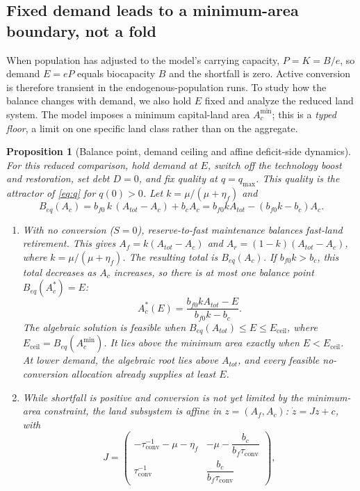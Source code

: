 \documentclass[preprint,12pt,authoryear]{elsarticle}
\newtheorem{proposition}{Proposition}
\newcommand{\Eceil}{E_{\mathrm{ceil}}}
\newcommand{\Acmin}{A_c^{\min}}
\newcommand{\tconv}{\tau_{\mathrm{conv}}}
\begin{document}
\subsection{Fixed demand leads to a minimum-area boundary, not a fold}\label{sec:ceiling}

When population has adjusted to the model's carrying capacity, $P=K=B/e$, so demand $E=eP$ equals biocapacity $B$ and the shortfall is zero. Active conversion is therefore transient in the endogenous-population runs. To study how the balance changes with demand, we also hold $E$ fixed and analyze the reduced land system. The model imposes a minimum capital-land area $\Acmin$; this is a \emph{typed floor}, a limit on one specific land class rather than on the aggregate.

\begin{proposition}[Balance point, demand ceiling and affine deficit-side dynamics]\label{prop:ceiling}
For this reduced comparison, hold demand at $E$, switch off the technology boost and restoration, set debt $D=0$, and fix quality at $q=q_{\max}$. This quality is the attractor of \eqref{eq:q} for $q(0)>0$. Let $k=\mu/(\mu+\eta_f)$ and
\begin{equation}\label{eq:Beq}
B_{eq}(A_c)=b_{f0}\,k\,(A_{tot}-A_c)+b_cA_c=b_{f0}kA_{tot}-(b_{f0}k-b_c)A_c .
\end{equation}
\begin{enumerate}[label=(\roman*)]
\item With no conversion ($S=0$), reserve-to-fast maintenance balances fast-land retirement. This gives $A_f=k(A_{tot}-A_c)$ and $A_r=(1-k)(A_{tot}-A_c)$, where $k=\mu/(\mu+\eta_f)$. The resulting total is $B_{eq}(A_c)$. If $b_{f0}k>b_c$, this total decreases as $A_c$ increases, so there is at most one balance point $B_{eq}(A_c^*)=E$:
\begin{equation}\label{eq:Acstar}
A_c^*(E)=\frac{b_{f0}kA_{tot}-E}{b_{f0}k-b_c}.
\end{equation}
The algebraic solution is feasible when $B_{eq}(A_{tot})\le E\le\Eceil$, where $\Eceil=B_{eq}(\Acmin)$. It lies above the minimum area exactly when $E<\Eceil$. At lower demand, the algebraic root lies above $A_{tot}$, and every feasible no-conversion allocation already supplies at least $E$.
\item While shortfall is positive and conversion is not yet limited by the minimum-area constraint, the land subsystem is affine in $z=(A_f,A_c)$: $\dot z=Jz+c$, with
\begin{equation}\label{eq:J}
J=\begin{pmatrix}-\tconv^{-1}-\mu-\eta_f & -\mu-\dfrac{b_c}{b_f\tconv}\\[8pt] \tconv^{-1} & \dfrac{b_c}{b_f\tconv}\end{pmatrix},

\end{equation}
\end{enumerate}
\end{proposition}
\end{document}
